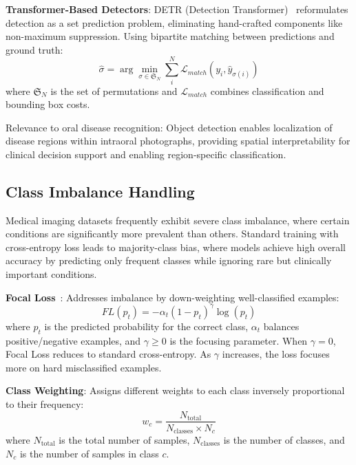\textbf{Transformer-Based Detectors}: DETR (Detection Transformer)~\cite{carion2020detr} reformulates detection as a set prediction problem, eliminating hand-crafted components like non-maximum suppression. Using bipartite matching between predictions and ground truth:
\begin{equation}
\hat{\sigma} = \arg\min_{\sigma \in \mathfrak{S}_N} \sum_{i}^N \mathcal{L}_{match}(y_i, \hat{y}_{\sigma(i)})
\end{equation}
where $\mathfrak{S}_N$ is the set of permutations and $\mathcal{L}_{match}$ combines classification and bounding box costs.

Relevance to oral disease recognition: Object detection enables localization of disease regions within intraoral photographs, providing spatial interpretability for clinical decision support and enabling region-specific classification.

\subsection{Class Imbalance Handling}

Medical imaging datasets frequently exhibit severe class imbalance, where certain conditions are significantly more prevalent than others. Standard training with cross-entropy loss leads to majority-class bias, where models achieve high overall accuracy by predicting only frequent classes while ignoring rare but clinically important conditions.

\textbf{Focal Loss}~\cite{lin2017focal}: Addresses imbalance by down-weighting well-classified examples:
\begin{equation}
FL(p_t) = -\alpha_t(1-p_t)^\gamma \log(p_t)
\end{equation}
where $p_t$ is the predicted probability for the correct class, $\alpha_t$ balances positive/negative examples, and $\gamma \geq 0$ is the focusing parameter. When $\gamma = 0$, Focal Loss reduces to standard cross-entropy. As $\gamma$ increases, the loss focuses more on hard misclassified examples.

\textbf{Class Weighting}: Assigns different weights to each class inversely proportional to their frequency:
\begin{equation}
w_c = \frac{N_{\text{total}}}{N_{\text{classes}} \times N_c}
\end{equation}
where $N_{\text{total}}$ is the total number of samples, $N_{\text{classes}}$ is the number of classes, and $N_c$ is the number of samples in class $c$.

